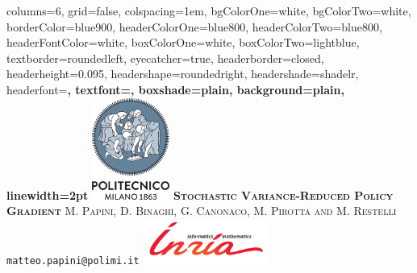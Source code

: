 \documentclass[portrait,a0paper,fontscale=0.312]{baposter}
\begin{document}
\begin{poster}%
  {
  columns=6,
  grid=false,
  colspacing=1em,
  bgColorOne=white,
  bgColorTwo=white,
  borderColor=blue900,
  headerColorOne=blue800,
  headerColorTwo=blue800,
  headerFontColor=white,
  boxColorOne=white,
  boxColorTwo=lightblue,
  textborder=roundedleft,
  eyecatcher=true,
  headerborder=closed,
  headerheight=0.095\textheight,
  headershape=roundedright,
  headershade=shadelr,
  headerfont=\large\bf\textsc, %
  textfont={\setlength{\parindent}{1.5em}},
  boxshade=plain,
  background=plain,
  linewidth=2pt
  }
  {\includegraphics[height=9.0em]{./pics/polilogo/logoPoliBlue_poster.png}}
  {\bf\textsc{Stochastic Variance-Reduced Policy Gradient}\vspace{0.1em}}
  {\textsc{M. Papini, D. Binaghi, G. Canonaco, M. Pirotta and M. Restelli}\\ 
  {\normalsize \texttt{matteo.papini@polimi.it}}
  }
  {%
    \includegraphics[height=4em]{./pics/inria_sc}
  }


\end{poster}
\end{document}
